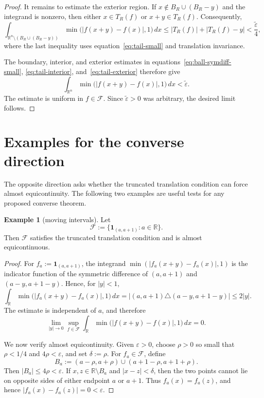 \documentclass[11pt]{article}
\theoremstyle{plain}
\theoremstyle{definition}
\newtheorem{example}{Example}
\theoremstyle{remark}
\newcommand{\R}{\mathbb{R}}
\newcommand{\F}{\mathcal{F}}
\newcommand{\eps}{\varepsilon}
\newcommand{\meas}[1]{\lvert #1\rvert}
\begin{document}
\begin{proof}
It remains to estimate the exterior region. If
$x\notin B_R\cup(B_R-y)$ and the integrand is nonzero, then either
$x\in T_R(f)$ or $x+y\in T_R(f)$. Consequently,
\begin{equation}\label{eq:tail-exterior}
    \int_{\R^n\setminus(B_R\cup(B_R-y))}
    \min\bigl(|f(x+y)-f(x)|,1\bigr)\,dx
    \le \meas{T_R(f)}+\meas{T_R(f)-y}
    <\frac{\widetilde\eps}{4},
\end{equation}
where the last inequality uses equation~\eqref{eq:tail-small} and
translation invariance.

The boundary, interior, and exterior estimates in
equations~\eqref{eq:ball-symdiff-small}, \eqref{eq:tail-interior},
and~\eqref{eq:tail-exterior} therefore give
\[
    \int_{\R^n}\min\bigl(|f(x+y)-f(x)|,1\bigr)\,dx
    <\widetilde\eps .
\]
The estimate is uniform in $f\in\F$. Since $\widetilde\eps>0$ was arbitrary,
the desired limit follows.
\end{proof}

\section{Examples for the converse direction}

The opposite direction asks whether the truncated translation condition can
force almost equicontinuity. The following two examples are useful tests for
any proposed converse theorem.

\begin{example}[moving intervals]\label{ex:moving-intervals}
Let
\[
    \F:=\{\mathbf 1_{(a,a+1)}:a\in\R\}.
\]
Then $\F$ satisfies the truncated translation condition and is almost
equicontinuous.
\end{example}

\begin{proof}
For $f_a:=\mathbf 1_{(a,a+1)}$, the integrand
$\min(|f_a(x+y)-f_a(x)|,1)$ is the indicator function of the symmetric
difference of $(a,a+1)$ and $(a-y,a+1-y)$. Hence, for $|y|<1$,
\[
    \int_{\R}\min\bigl(|f_a(x+y)-f_a(x)|,1\bigr)\,dx
    =
    \meas{(a,a+1)\triangle(a-y,a+1-y)}
    \le 2|y|.
\]
The estimate is independent of $a$, and therefore
\[
    \lim_{|y|\to0}\sup_{f\in\F}
    \int_{\R}\min\bigl(|f(x+y)-f(x)|,1\bigr)\,dx=0.
\]

We now verify almost equicontinuity. Given $\eps>0$, choose
$\rho>0$ so small that $\rho<1/4$ and $4\rho<\eps$, and set
$\delta:=\rho$. For $f_a\in\F$, define
\[
    B_a:=(a-\rho,a+\rho)\cup(a+1-\rho,a+1+\rho).
\]
Then $\meas{B_a}\le4\rho<\eps$. If $x,z\in\R\setminus B_a$ and
$|x-z|<\delta$, then the two points cannot lie on opposite sides of either
endpoint $a$ or $a+1$. Thus $f_a(x)=f_a(z)$, and hence
$|f_a(x)-f_a(z)|=0<\eps$.
\end{proof}
\end{document}

